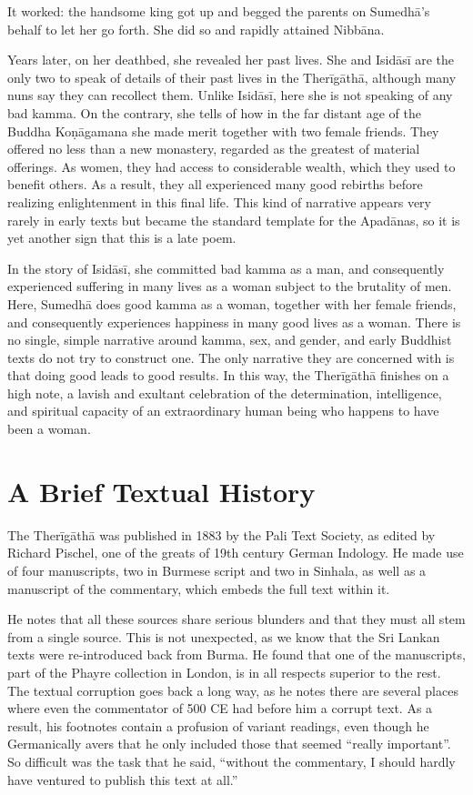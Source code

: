 \documentclass[12pt,openany]{book}%
\begin{document}
It worked: the handsome king got up and begged the parents on \textsanskrit{Sumedhā}’s behalf to let her go forth. She did so and rapidly attained \textsanskrit{Nibbāna}.

Years later, on her deathbed, she revealed her past lives. She and \textsanskrit{Isidāsī} are the only two to speak of details of their past lives in the \textsanskrit{Therīgāthā}, although many nuns say they can recollect them. Unlike \textsanskrit{Isidāsī}, here she is not speaking of any bad kamma. On the contrary, she tells of how in the far distant age of the Buddha \textsanskrit{Koṇāgamana} she made merit together with two female friends. They offered no less than a new monastery, regarded as the greatest of material offerings. As women, they had access to considerable wealth, which they used to benefit others. As a result, they all experienced many good rebirths before realizing enlightenment in this final life. This kind of narrative appears very rarely in early texts but became the standard template for the \textsanskrit{Apadānas}, so it is yet another sign that this is a late poem.

In the story of \textsanskrit{Isidāsī}, she committed bad kamma as a man, and consequently experienced suffering in many lives as a woman subject to the brutality of men. Here, \textsanskrit{Sumedhā} does good kamma as a woman, together with her female friends, and consequently experiences happiness in many good lives as a woman. There is no single, simple narrative around kamma, sex, and gender, and early Buddhist texts do not try to construct one. The only narrative they are concerned with is that doing good leads to good results. In this way, the \textsanskrit{Therīgāthā} finishes on a high note, a lavish and exultant celebration of the determination, intelligence, and spiritual capacity of an extraordinary human being who happens to have been a woman.

\section*{A Brief Textual History}

The \textsanskrit{Therīgāthā} was published in 1883 by the Pali Text Society, as edited by Richard Pischel, one of the greats of 19th century German Indology. He made use of four manuscripts, two in Burmese script and two in Sinhala, as well as a manuscript of the commentary, which embeds the full text within it.

He notes that all these sources share serious blunders and that they must all stem from a single source. This is not unexpected, as we know that the Sri Lankan texts were re-introduced back from Burma. He found that one of the manuscripts, part of the Phayre collection in London, is in all respects superior to the rest. The textual corruption goes back a long way, as he notes there are several places where even the commentator of 500 CE had before him a corrupt text. As a result, his footnotes contain a profusion of variant readings, even though he Germanically avers that he only included those that seemed “really important”. So difficult was the task that he said, “without the commentary, I should hardly have ventured to publish this text at all.”
\end{document}

